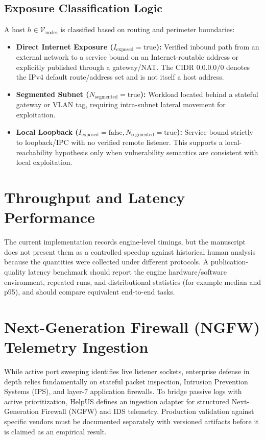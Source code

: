 \subsection{Exposure Classification Logic}
A host $h \in \mathcal{V}_{\text{nodes}}$ is classified based on routing and perimeter boundaries:
\begin{itemize}
    \item \textbf{Direct Internet Exposure ($I_{\text{exposed}} = \text{true}$):} Verified inbound path from an external network to a service bound on an Internet-routable address or explicitly published through a gateway/NAT. The CIDR $0.0.0.0/0$ denotes the IPv4 default route/address set and is not itself a host address.
    \item \textbf{Segmented Subnet ($N_{\text{segmented}} = \text{true}$):} Workload located behind a stateful gateway or VLAN tag, requiring intra-subnet lateral movement for exploitation.
    \item \textbf{Local Loopback ($I_{\text{exposed}} = \text{false}, N_{\text{segmented}} = \text{true}$):} Service bound strictly to loopback/IPC with no verified remote listener. This supports a local-reachability hypothesis only when vulnerability semantics are consistent with local exploitation.
\end{itemize}

\section{Throughput and Latency Performance}

The current implementation records engine-level timings, but the manuscript does not present them as a controlled speedup against historical human analysis because the quantities were collected under different protocols. A publication-quality latency benchmark should report the engine hardware/software environment, repeated runs, and distributional statistics (for example median and p95), and should compare equivalent end-to-end tasks.

\section{Next-Generation Firewall (NGFW) Telemetry Ingestion}
\label{sec:ngfw_telemetry}
While active port sweeping identifies live listener sockets, enterprise defense in depth relies fundamentally on stateful packet inspection, Intrusion Prevention Systems (IPS), and layer-7 application firewalls. To bridge passive logs with active prioritization, HelpUS defines an ingestion adapter for structured Next-Generation Firewall (NGFW) and IDS telemetry. Production validation against specific vendors must be documented separately with versioned artifacts before it is claimed as an empirical result.

